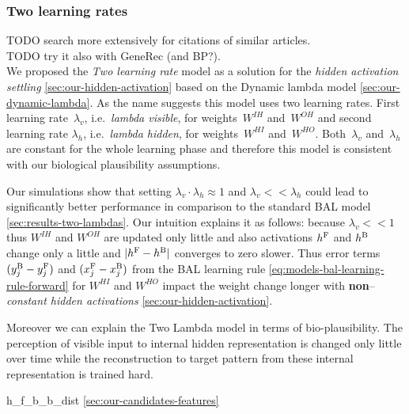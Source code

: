 
\subsubsection{Two learning rates} 
\label{sec:our-two-lambdas}

TODO search more extensively for citations of similar articles. \\
TODO try it also with GeneRec (and BP?).  \\ 

We proposed the \emph{Two learning rate} model as a solution for the \emph{hidden activation settling} \ref{sec:our-hidden-activation} based on the Dynamic lambda model \ref{sec:our-dynamic-lambda}. As the name suggests this model uses two learning rates. First learning rate~$\lambda_v$, i.e.~\emph{lambda visible}, for weights~$W^{IH}$ and~$W^{OH}$ and second learning rate $\lambda_h$, i.e.~\emph{lambda hidden}, for weights~$W^{HI}$ and~$W^{HO}$. Both~$\lambda_v$ and~$\lambda_h$ are constant for the whole learning phase and therefore this model is consistent with our biological plausibility assumptions. 

Our simulations show that setting $\lambda_v \cdot \lambda_h \approx 1$ and $\lambda_v << \lambda_h$ could lead to significantly better performance in comparison to the standard BAL model \ref{sec:results-two-lambdas}. Our intuition explains it as follows: because $\lambda_v << 1$ thus $W^{IH}$ and $W^{OH}$ are updated only little and also activations $h^{\rm F}$ and $h^{\rm B}$ change only a little and $|h^{\rm F}- h^{\rm B}|$ converges to zero slower. Thus error terms $(y_j^{\rm B} - y_j^{\rm F})$ and $(x_j^{\rm F} - x_j^{\rm B})$ from the BAL learning rule \ref{eq:models-bal-learning-rule-forward} for $W^{HI}$ and $W^{HO}$ impact the weight change longer with {\bf non}--\emph{constant hidden activations} \ref{sec:our-hidden-activation}. 

Moreover we can explain the Two Lambda model in terms of bio-plausibility. The perception of visible input to internal hidden representation is changed only little over time while the reconstruction to target pattern from these internal representation is trained hard. 

h\_f\_b\_b\_dist \ref{sec:our-candidates-features}


